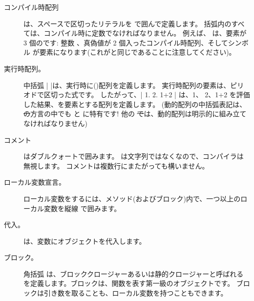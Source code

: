 \documentclass[a4paper,10pt,twoside]{book}
\begin{document}
\begin{description}
\item[コンパイル時配列] は、スペースで区切ったリテラルを \ct{#( )} で囲んで定義します。
		括弧内のすべては、コンパイル時に定数でなければなりません。
		例えば、 は、要素が 3 個のです: 整数 、真偽値が 2 個入ったコンパイル時配列、そしてシンボル  が要素になります(これがと同じであることに注意してください)。

\item[実行時配列。] 中括弧 \ct|{ }|は、実行時に()配列を定義します。
		実行時配列の要素は、ピリオドで区切った式です。
		したがって、\ct|{ 1. 2. 1+2 }| は、1、 2、1+2 を評価した結果、を要素とする配列を定義します。
		(動的配列の中括弧表記は、\st の方言の中でも \pharo と \squeak に特有です!
		他の \st では、動的配列は明示的に組み立てなければなりません)

\item[コメント] はダブルクォートで囲みます。
		 は文字列ではなくなので、\pharo コンパイラは無視します。
		コメントは複数行にまたがっても構いません。
		
\item[ローカル変数宣言。] ローカル変数をするには、メソッド(およびブロック)内で、一つ以上のローカル変数を縦線 \ct{| |} で囲みます。

\item[代入。] \ct{:=} は、変数にオブジェクトを代入します。

\item[ブロック。] 角括弧 \ct{[ ]} は、ブロッククロージャーあるいは静的クロージャーと呼ばれるを定義します。ブロックは、関数を表す第一級のオブジェクトです。
		ブロックは引き数を取ることも、ローカル変数を持つこともできます。


\end{description}
\end{document}
